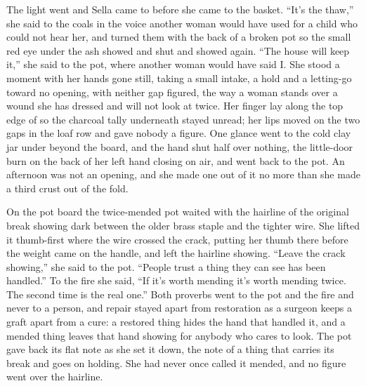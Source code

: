 The light went and Sella came to  before she came to the basket. “It's the thaw,” she said to the coals in the voice another woman would have used for a child who could not hear her, and turned them with the back of a broken pot so the small red eye under the ash showed and shut and showed again. “The house will keep it,” she said to the pot, where another woman would have said I. She stood a moment with her hands gone still, taking a small intake, a hold and a letting-go toward no opening, with neither gap figured, the way a woman stands over a wound she has dressed and will not look at twice. Her finger lay along the top edge of  so the charcoal tally underneath stayed unread; her lips moved on the two gaps in the loaf row and gave nobody a figure. One glance went to the cold clay jar under  beyond the board, and the hand shut half over nothing, the little-door burn on the back of her left hand closing on air, and went back to the pot. An afternoon was not an opening, and she made one out of it no more than she made a third crust out of the fold.

On the pot board the twice-mended pot waited with the hairline of the original break showing dark between the older brass staple and the tighter wire. She lifted it thumb-first where the wire crossed the crack, putting her thumb there before the weight came on the handle, and left the hairline showing. “Leave the crack showing,” she said to the pot. “People trust a thing they can see has been handled.” To the fire she said, “If it's worth mending it's worth mending twice. The second time is the real one.” Both proverbs went to the pot and the fire and never to a person, and repair stayed apart from restoration as a surgeon keeps a graft apart from a cure: a restored thing hides the hand that handled it, and a mended thing leaves that hand showing for anybody who cares to look. The pot gave back its flat note as she set it down, the note of a thing that carries its break and goes on holding. She had never once called it mended, and no figure went over the hairline.

